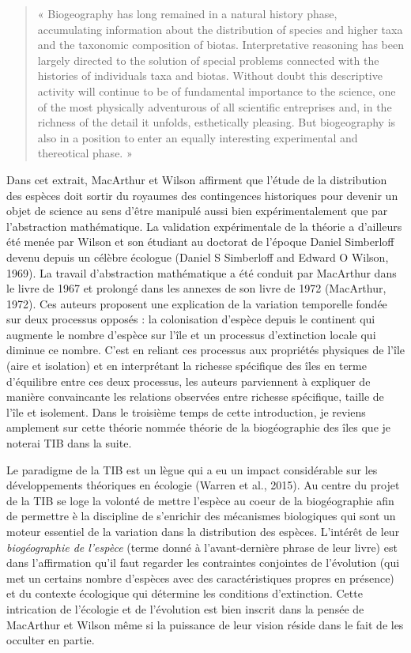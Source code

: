 \begin{quote}
« Biogeography has long remained in a natural history phase,
accumulating information about the distribution of species and higher
taxa and the taxonomic composition of biotas. Interpretative reasoning
has been largely directed to the solution of special problems connected
with the histories of individuals taxa and biotas. Without doubt this
descriptive activity will continue to be of fundamental importance to
the science, one of the most physically adventurous of all scientific
entreprises and, in the richness of the detail it unfolds, esthetically
pleasing. But biogeography is also in a position to enter an equally
interesting experimental and thereotical phase. »
\end{quote}

Dans cet extrait, MacArthur et Wilson affirment que l'étude de la
distribution des espèces doit sortir du royaumes des contingences
historiques pour devenir un objet de science au sens d'être manipulé
aussi bien expérimentalement que par l'abstraction mathématique. La
validation expérimentale de la théorie a d'ailleurs été menée par Wilson
et son étudiant au doctorat de l'époque Daniel Simberloff devenu depuis
un célèbre écologue (Daniel S Simberloff and Edward O Wilson, 1969). La
travail d'abstraction mathématique a été conduit par MacArthur dans le
livre de 1967 et prolongé dans les annexes de son livre de 1972
(MacArthur, 1972). Ces auteurs proposent une explication de la variation
temporelle fondée sur deux processus opposés : la colonisation d'espèce
depuis le continent qui augmente le nombre d'espèce sur l'île et un
processus d'extinction locale qui diminue ce nombre. C'est en reliant
ces processus aux propriétés physiques de l'île (aire et isolation) et
en interprétant la richesse spécifique des îles en terme d'équilibre
entre ces deux processus, les auteurs parviennent à expliquer de manière
convaincante les relations observées entre richesse spécifique, taille
de l'île et isolement. Dans le troisième temps de cette introduction, je
reviens amplement sur cette théorie nommée théorie de la biogéographie
des îles que je noterai TIB dans la suite.

Le paradigme de la TIB est un lègue qui a eu un impact considérable sur
les développements théoriques en écologie (Warren et al., 2015). Au
centre du projet de la TIB se loge la volonté de mettre l'espèce au
coeur de la biogéographie afin de permettre è la discipline de
s'enrichir des mécanismes biologiques qui sont un moteur essentiel de la
variation dans la distribution des espèces. L'intérêt de leur
\emph{biogéographie de l'espèce} (terme donné à l'avant-dernière phrase
de leur livre) est dans l'affirmation qu'il faut regarder les
contraintes conjointes de l'évolution (qui met un certains nombre
d'espèces avec des caractéristiques propres en présence) et du contexte
écologique qui détermine les conditions d'extinction. Cette intrication
de l'écologie et de l'évolution est bien inscrit dans la pensée de
MacArthur et Wilson même si la puissance de leur vision réside dans le
fait de les occulter en partie.

